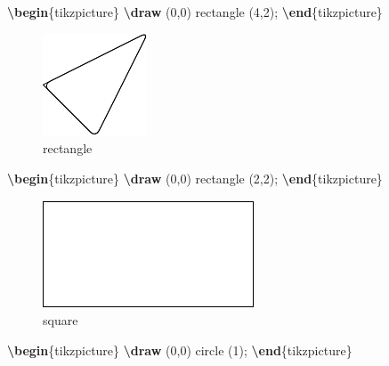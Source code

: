 \documentclass[
]{book}
\newenvironment{Shaded}{\begin{snugshade}}{\end{snugshade}}
\newcommand{\ExtensionTok}[1]{#1}
\newcommand{\FunctionTok}[1]{\textcolor[rgb]{0.13,0.29,0.53}{\textbf{#1}}}
\newcommand{\KeywordTok}[1]{\textcolor[rgb]{0.13,0.29,0.53}{\textbf{#1}}}
\newcommand{\NormalTok}[1]{#1}
\theoremstyle{definition}
\theoremstyle{definition}
\theoremstyle{definition}
\theoremstyle{definition}
\theoremstyle{remark}
\begin{document}
\begin{Shaded}
\begin{Highlighting}[]
\KeywordTok{\textbackslash{}begin}\NormalTok{\{}\ExtensionTok{tikzpicture}\NormalTok{\}}
  \FunctionTok{\textbackslash{}draw}\NormalTok{ (0,0) rectangle (4,2);}
\KeywordTok{\textbackslash{}end}\NormalTok{\{}\ExtensionTok{tikzpicture}\NormalTok{\}}
\end{Highlighting}
\end{Shaded}

\begin{figure}
\includegraphics[width=0.25\linewidth]{202401311000-TikZ_files/figure-latex/unnamed-chunk-18-1} \caption{rectangle}\label{fig:unnamed-chunk-18}
\end{figure}

\begin{Shaded}
\begin{Highlighting}[]
\KeywordTok{\textbackslash{}begin}\NormalTok{\{}\ExtensionTok{tikzpicture}\NormalTok{\}}
  \FunctionTok{\textbackslash{}draw}\NormalTok{ (0,0) rectangle (2,2);}
\KeywordTok{\textbackslash{}end}\NormalTok{\{}\ExtensionTok{tikzpicture}\NormalTok{\}}
\end{Highlighting}
\end{Shaded}

\begin{figure}
\includegraphics[width=0.25\linewidth]{202401311000-TikZ_files/figure-latex/unnamed-chunk-20-1} \caption{square}\label{fig:unnamed-chunk-20}
\end{figure}

\begin{Shaded}
\begin{Highlighting}[]
\KeywordTok{\textbackslash{}begin}\NormalTok{\{}\ExtensionTok{tikzpicture}\NormalTok{\}}
  \FunctionTok{\textbackslash{}draw}\NormalTok{ (0,0) circle (1);}
\KeywordTok{\textbackslash{}end}\NormalTok{\{}\ExtensionTok{tikzpicture}\NormalTok{\}}
\end{Highlighting}
\end{Shaded}
\end{document}
